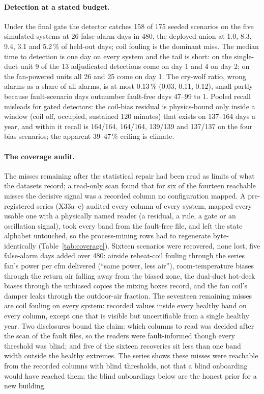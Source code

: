 \documentclass[11pt,letterpaper]{article}
\begin{document}
\paragraph{Detection at a stated budget.} Under the final gate the detector catches 158 of 175 seeded scenarios on the five simulated systems at 26 false-alarm days in 480, the deployed union at 1.0, 8.3, 9.4, 3.1 and 5.2\,\% of held-out days; coil fouling is the dominant miss. The median time to detection is one day on every system and the tail is short: on the single-duct unit 9 of the 13 adjudicated detections come on day 1 and 4 on day 2; on the fan-powered units all 26 and 25 come on day 1. The cry-wolf ratio, wrong alarms as a share of all alarms, is at most 0.13\,\% (0.03, 0.11, 0.12), small partly because fault-scenario days outnumber fault-free days 47--99 to 1. Pooled recall misleads for gated detectors: the coil-bias residual is physics-bound only inside a window (coil off, occupied, sustained 120 minutes) that exists on 137--164 days a year, and within it recall is 164/164, 164/164, 139/139 and 137/137 on the four bias scenarios; the apparent 39--47\,\% ceiling is climate.

\paragraph{The coverage audit.}\label{sec:coverage} The misses remaining after the statistical repair had been read as limits of what the datasets record; a read-only scan found that for six of the fourteen reachable misses the decisive signal was a recorded column no configuration mapped. A pre-registered series (X33a--e) audited every column of every system, mapped every usable one with a physically named reader (a residual, a rule, a gate or an oscillation signal), took every band from the fault-free file, and left the state alphabet untouched, so the process-mining rows had to regenerate byte-identically (Table~\ref{tab:coverage}). Sixteen scenarios were recovered, none lost, five false-alarm days added over 480: airside reheat-coil fouling through the series fan's power per cfm delivered (``same power, less air''), room-temperature biases through the return air falling away from the biased zone, the dual-duct hot-deck biases through the unbiased copies the mixing boxes record, and the fan coil's damper leaks through the outdoor-air fraction. The seventeen remaining misses are coil fouling on every system: recorded values inside every healthy band on every column, except one that is visible but uncertifiable from a single healthy year. Two disclosures bound the claim: which columns to read was decided after the scan of the fault files, so the readers were fault-informed though every threshold was blind; and five of the sixteen recoveries sit less than one band width outside the healthy extremes. The series shows these misses were reachable from the recorded columns with blind thresholds, not that a blind onboarding would have reached them; the blind onboardings below are the honest prior for a new building.
\end{document}
